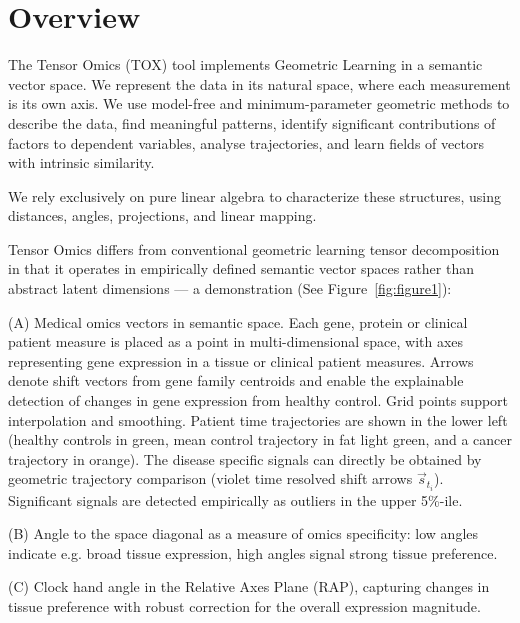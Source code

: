 \section{Overview}

    The Tensor Omics (TOX) tool implements Geometric Learning in a semantic vector space. We represent the data in its natural space, where each measurement is its own axis. We use model-free and minimum-parameter geometric methods to describe the data, find meaningful patterns, identify significant contributions of factors to dependent variables, analyse trajectories, and learn fields of vectors with intrinsic similarity. 

    We rely exclusively on pure linear algebra to characterize these structures, using distances, angles, projections, and linear mapping.

    \vspace{0.5cm}
    Tensor Omics differs from conventional geometric learning tensor decomposition in that it operates in empirically defined semantic vector spaces rather than abstract latent dimensions --- a demonstration (See Figure~\ref{fig:figure1}):

    \vspace{0.5cm}
    (A) Medical omics vectors in semantic space. Each gene, protein or clinical patient measure is placed as a point in multi-dimensional space, with axes representing gene expression in a tissue or clinical patient measures. Arrows denote shift vectors from gene family centroids and enable the explainable detection of changes in gene expression from healthy control. Grid points support interpolation and smoothing. Patient time trajectories are shown in the lower left (healthy controls in green, mean control trajectory in fat light green, and a cancer trajectory in orange). The disease specific signals can directly be obtained by geometric trajectory comparison (violet time resolved shift arrows $\vec{s}_{t_i}$). Significant signals are detected empirically as outliers in the upper 5\%-ile.

    \vspace{0.5cm}
    (B) Angle to the space diagonal as a measure of omics specificity: low angles indicate e.g. broad tissue expression, high angles signal strong tissue preference.

    \vspace{0.5cm}
    (C) Clock hand angle in the Relative Axes Plane (RAP), capturing changes in tissue preference with robust correction for the overall expression magnitude.

